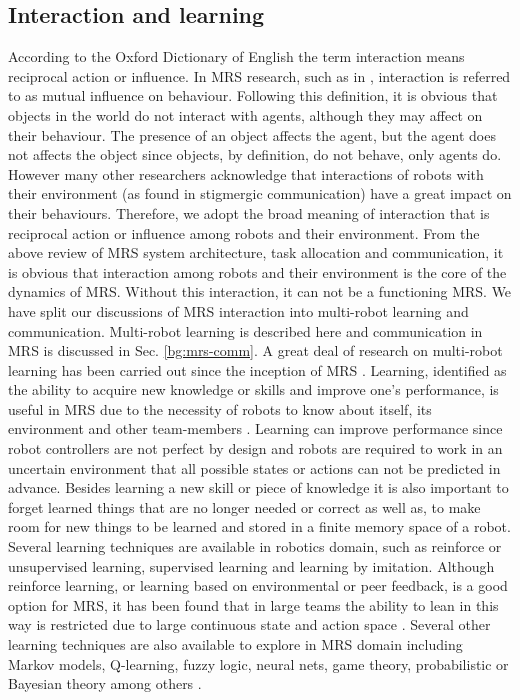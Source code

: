 \subsection*{Interaction and learning}
\label{bg:mrs:learn}
According to the Oxford Dictionary of English the term interaction means reciprocal action or influence. In MRS research, such as in \cite{Mataric1994}, interaction is referred to as mutual influence on behaviour. Following this definition, it is obvious that objects in the world do not interact with agents, although they may affect on their behaviour. The presence of an object affects the agent, but the agent does not affects the object since objects, by definition, do not behave, only agents do. However many other researchers acknowledge that interactions of robots with their environment (as found in stigmergic communication) have a great impact on their behaviours. Therefore, we adopt the broad meaning of interaction that is reciprocal action or influence among robots and their environment. From the above review of MRS system architecture, task allocation and communication, it is obvious that interaction among robots and their environment is the core of the dynamics of MRS. Without this interaction, it can not be a functioning MRS. We have split our discussions of MRS interaction into multi-robot learning and communication. Multi-robot learning is described here and communication in MRS is discussed in Sec. \ref{bg:mrs-comm}.
A great deal of research on multi-robot learning has been carried out since the inception of MRS \cite{Mataric+2001,Yang+2004,Parker1995}. Learning, identified as the ability to acquire new knowledge or skills and improve one's performance, is useful in MRS due to the necessity of robots to know about itself, its environment and other team-members \cite{Mataric2007}. Learning can improve performance since robot controllers are not perfect by design and robots are required to work in an uncertain environment that all possible states or actions can not be predicted in advance. Besides learning a new skill or piece of knowledge it is also important to forget learned things that are no longer needed or correct as well as, to make room for new things to be learned and stored in a finite memory space of a robot. \\
Several learning techniques are available in robotics domain, such as reinforce or unsupervised learning, supervised learning and learning by imitation. Although reinforce learning, or learning based on environmental or peer feedback, is a good option for MRS, it has been found that in large teams the ability to lean in this way is restricted due to large continuous state and action space \cite{Yang+2004}. Several other learning techniques are also available to explore in MRS domain including Markov models, Q-learning, fuzzy logic, neural nets, game theory, probabilistic or Bayesian theory among others \cite{Mataric2007}. \\

